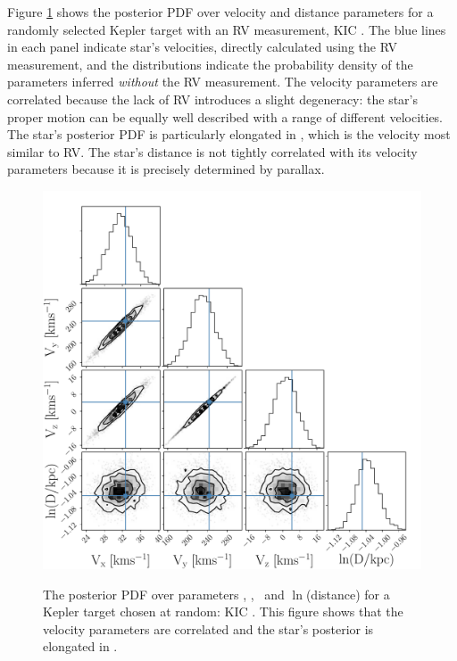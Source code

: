 Figure \ref{fig:posterior} shows the posterior PDF over velocity and distance
parameters for a randomly selected Kepler target with an RV measurement, KIC
\kicstar.
The blue lines in each panel indicate star's velocities, directly calculated
using the RV measurement, and the distributions indicate the probability
density of the parameters inferred {\it without} the RV measurement.
The velocity parameters are correlated because the lack of RV introduces a
slight degeneracy: the star's proper motion can be equally well described with
a range of different velocities.
The star's posterior PDF is particularly elongated in \vy, which is the
velocity most similar to RV.
The star's distance is not tightly correlated with its velocity parameters
because it is precisely determined by parallax.
\begin{figure}[ht!]
\caption{
The posterior PDF over parameters \vx, \vy, \vz\ and $\ln$(distance) for a
    Kepler target chosen at random: KIC \kicstar.
This figure shows that the velocity parameters are correlated and the star's
    posterior is elongated in \vy.
    }
  \centering
    \includegraphics[width=.7\textwidth]{posterior}
\label{fig:posterior}
\end{figure}
